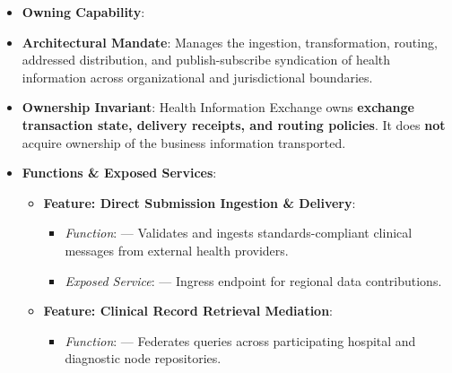 \begin{itemize}

\item
\textbf{Owning Capability}: \texttt{}



\item
\textbf{Architectural Mandate}: Manages the ingestion, transformation, routing, addressed distribution, and publish-subscribe syndication of health information across organizational and jurisdictional boundaries.



\item
\textbf{Ownership Invariant}: Health Information Exchange owns \textbf{exchange transaction state, delivery receipts, and routing policies}. It does \textbf{not} acquire ownership of the business information transported.



\item
\textbf{Functions \& Exposed Services}:


\begin{itemize}

\item
\textbf{Feature: Direct Submission Ingestion \& Delivery}:


\begin{itemize}

\item
\emph{Function}: \texttt{} — Validates and ingests standards-compliant clinical messages from external health providers.



\item
\emph{Exposed Service}: \texttt{} — Ingress endpoint for regional data contributions.



\end{itemize}


\item
\textbf{Feature: Clinical Record Retrieval Mediation}:


\begin{itemize}

\item
\emph{Function}: \texttt{} — Federates queries across participating hospital and diagnostic node repositories.




\end{itemize}
\end{itemize}
\end{itemize}
